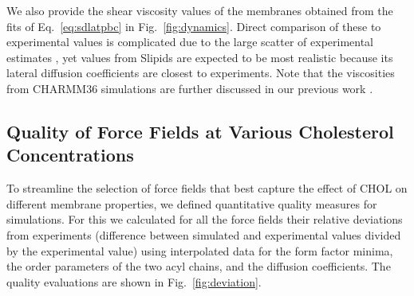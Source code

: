\documentclass[journal=jctcce]{achemso}
\begin{document}
We also provide the shear viscosity values of the membranes obtained from the fits of Eq.~\eqref{eq:sdlatpbc} in Fig.~\ref{fig:dynamics}. Direct comparison of these to experimental values is complicated due to the large scatter of experimental estimates \cite{faizi2022vesicle}, yet values from Slipids are expected to be  most realistic because its lateral diffusion coefficients are closest to experiments. Note that the viscosities from CHARMM36 simulations are further  discussed in our previous work \cite{fabian2023protein}.

\subsection{Quality of Force Fields at Various Cholesterol Concentrations}

To streamline the selection of force fields that best capture the effect of CHOL on different membrane properties, we defined  quantitative quality measures for simulations. For this we calculated for all the force fields their relative deviations from experiments (difference between simulated and experimental values divided by the experimental value) using interpolated data for the form factor minima, the order parameters of the two acyl chains, and the diffusion coefficients. The quality evaluations are shown in Fig.~\ref{fig:deviation}.
\end{document}

